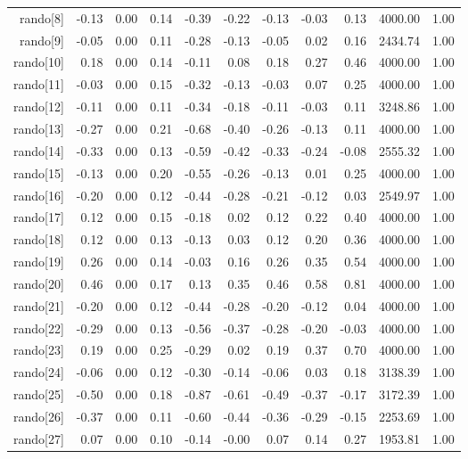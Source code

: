 \begin{table}[ht]
\begin{tabular}{rrrrrrrrrrr}
  rando[8] & -0.13 & 0.00 & 0.14 & -0.39 & -0.22 & -0.13 & -0.03 & 0.13 & 4000.00 & 1.00 \\ 
  rando[9] & -0.05 & 0.00 & 0.11 & -0.28 & -0.13 & -0.05 & 0.02 & 0.16 & 2434.74 & 1.00 \\ 
  rando[10] & 0.18 & 0.00 & 0.14 & -0.11 & 0.08 & 0.18 & 0.27 & 0.46 & 4000.00 & 1.00 \\ 
  rando[11] & -0.03 & 0.00 & 0.15 & -0.32 & -0.13 & -0.03 & 0.07 & 0.25 & 4000.00 & 1.00 \\ 
  rando[12] & -0.11 & 0.00 & 0.11 & -0.34 & -0.18 & -0.11 & -0.03 & 0.11 & 3248.86 & 1.00 \\ 
  rando[13] & -0.27 & 0.00 & 0.21 & -0.68 & -0.40 & -0.26 & -0.13 & 0.11 & 4000.00 & 1.00 \\ 
  rando[14] & -0.33 & 0.00 & 0.13 & -0.59 & -0.42 & -0.33 & -0.24 & -0.08 & 2555.32 & 1.00 \\ 
  rando[15] & -0.13 & 0.00 & 0.20 & -0.55 & -0.26 & -0.13 & 0.01 & 0.25 & 4000.00 & 1.00 \\ 
  rando[16] & -0.20 & 0.00 & 0.12 & -0.44 & -0.28 & -0.21 & -0.12 & 0.03 & 2549.97 & 1.00 \\ 
  rando[17] & 0.12 & 0.00 & 0.15 & -0.18 & 0.02 & 0.12 & 0.22 & 0.40 & 4000.00 & 1.00 \\ 
  rando[18] & 0.12 & 0.00 & 0.13 & -0.13 & 0.03 & 0.12 & 0.20 & 0.36 & 4000.00 & 1.00 \\ 
  rando[19] & 0.26 & 0.00 & 0.14 & -0.03 & 0.16 & 0.26 & 0.35 & 0.54 & 4000.00 & 1.00 \\ 
  rando[20] & 0.46 & 0.00 & 0.17 & 0.13 & 0.35 & 0.46 & 0.58 & 0.81 & 4000.00 & 1.00 \\ 
  rando[21] & -0.20 & 0.00 & 0.12 & -0.44 & -0.28 & -0.20 & -0.12 & 0.04 & 4000.00 & 1.00 \\ 
  rando[22] & -0.29 & 0.00 & 0.13 & -0.56 & -0.37 & -0.28 & -0.20 & -0.03 & 4000.00 & 1.00 \\ 
  rando[23] & 0.19 & 0.00 & 0.25 & -0.29 & 0.02 & 0.19 & 0.37 & 0.70 & 4000.00 & 1.00 \\ 
  rando[24] & -0.06 & 0.00 & 0.12 & -0.30 & -0.14 & -0.06 & 0.03 & 0.18 & 3138.39 & 1.00 \\ 
  rando[25] & -0.50 & 0.00 & 0.18 & -0.87 & -0.61 & -0.49 & -0.37 & -0.17 & 3172.39 & 1.00 \\ 
  rando[26] & -0.37 & 0.00 & 0.11 & -0.60 & -0.44 & -0.36 & -0.29 & -0.15 & 2253.69 & 1.00 \\ 
  rando[27] & 0.07 & 0.00 & 0.10 & -0.14 & -0.00 & 0.07 & 0.14 & 0.27 & 1953.81 & 1.00 \\ 

\end{tabular}
\end{table}
